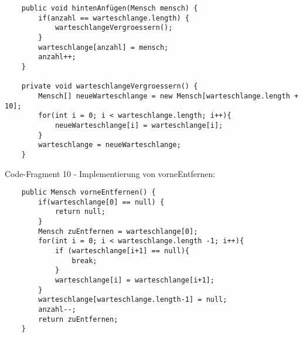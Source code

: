 \documentclass{article}
\begin{document}
\begin{verbatim}
    public void hintenAnfügen(Mensch mensch) {
        if(anzahl == warteschlange.length) {
            warteschlangeVergroessern();
        } 
        warteschlange[anzahl] = mensch;
        anzahl++;
    }

    private void warteschlangeVergroessern() {
        Mensch[] neueWarteschlange = new Mensch[warteschlange.length + 10];
        for(int i = 0; i < warteschlange.length; i++){
            neueWarteschlange[i] = warteschlange[i];
        }
        warteschlange = neueWarteschlange;
    }
\end{verbatim}
Code-Fragment 10 - Implementierung von vorneEntfernen:
\begin{verbatim}
    public Mensch vorneEntfernen() {
        if(warteschlange[0] == null) {
            return null;
        }
        Mensch zuEntfernen = warteschlange[0];
        for(int i = 0; i < warteschlange.length -1; i++){
            if (warteschlange[i+1] == null){
                break;
            }
            warteschlange[i] = warteschlange[i+1];
        }
        warteschlange[warteschlange.length-1] = null;
        anzahl--;
        return zuEntfernen;    
    }
\end{verbatim}
\end{document}
